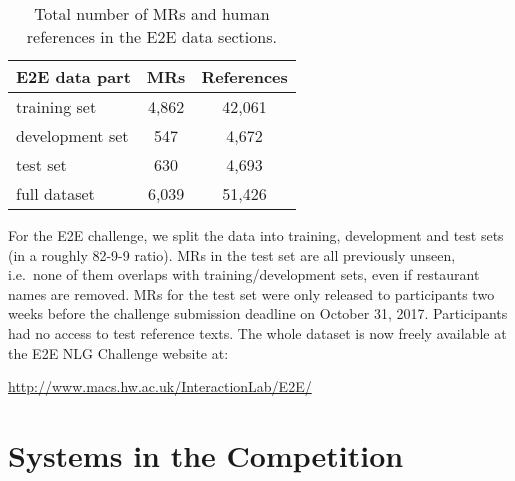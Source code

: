 \documentclass[11pt,a4paper]{article}
\begin{document}
\begin{table}[tb]
\centering
\small
\setlength{\extrarowheight}{2pt}
\begin{tabular}{lcc}
\textbf{E2E data part} & \textbf{MRs} & \textbf{References} \\ \hline \hline
training set & 4,862 & 42,061  \\
development set & \phantom{0,}547 & \phantom{0}4,672 \\
test set & \phantom{0,}630 & \phantom{0}4,693 \\\hdashline[0.5pt/2pt]
full dataset & 6,039 & 51,426
\end{tabular}
\caption{Total number of MRs and human references in the E2E data sections.}
\label{tab:dataset-stats}
\end{table}

For the E2E challenge, we split the data into training, development and test sets (in a roughly 82-9-9 ratio). MRs in the test set are all previously unseen, i.e.\ none of them overlaps with training/development sets, even if restaurant names are removed. MRs for the test set were only released to participants two weeks before the challenge submission deadline on October 31, 2017. Participants had no access to test reference texts.
The whole dataset is now freely available at the E2E NLG Challenge website at:
\begin{center}
\url{http://www.macs.hw.ac.uk/InteractionLab/E2E/}
\end{center}

\section{Systems in the Competition}\label{sec:systems}
\end{document}
